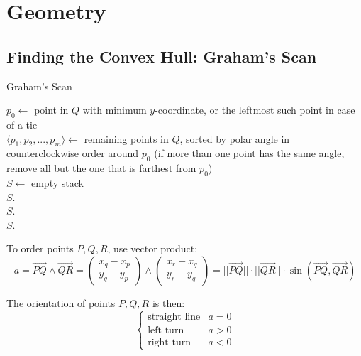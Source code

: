 \documentclass[a4paper, 12pt]{article}
\begin{document}
\section{Geometry}

  \subsection{Finding the Convex Hull: Graham's Scan}

\IncMargin{2em}
\begin{algorithm}[H]
\caption{Graham's Scan}
\vspace{0.1cm}
\Indm
{}
\Indp
\vspace{0.1cm}
$p_0 \gets$ point in $Q$ with minimum $y$-coordinate, or the leftmost such point in case of a tie\\
  $\langle p_1, p_2, ..., p_m\rangle\gets$ remaining points in $Q$, sorted by polar angle in counterclockwise order around $p_0$ (if more than one point has the same angle, remove all but the one that is farthest from $p_0$)\\
$S\gets$ empty stack\\
$S$.\\
$S$.\\
$S$.\\
\end{algorithm}
\DecMargin{2em}
\vspace{0.5cm}

To order points $P, Q, R$, use vector product: $$a = \overrightarrow{PQ}\wedge\overrightarrow{QR} = \left(\begin{array}{c}x_q - x_p\\y_q - y_p\end{array}\right)\wedge\left(\begin{array}{c}x_r - x_q\\y_r - y_q\end{array}\right) = ||\overrightarrow{PQ}||\cdot||\overrightarrow{QR}||\cdot\sin(\overrightarrow{PQ}, \overrightarrow{QR})$$

The orientation of points $P, Q, R$ is then:
$$\left\{\begin{array}{ll}\text{straight line} & a = 0\\ \text{left turn} & a > 0\\ \text{right turn} & a < 0\end{array}\right.$$
\end{document}
